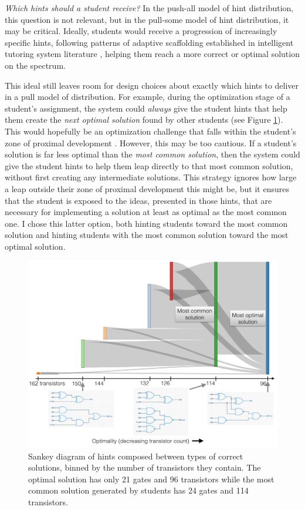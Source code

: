 {\it Which hints should a student receive?} In the push-all model of hint distribution, this question is not relevant, but in the pull-some model of hint distribution, it may be critical. Ideally, students would receive a progression of increasingly specific hints, following patterns of adaptive scaffolding established in intelligent tutoring system literature \cite{andes}, helping them reach a more correct or optimal solution on the spectrum. 

This ideal still leaves room for design choices about exactly which hints to deliver in a pull model of distribution. For example, during the optimization stage of a student's assignment, the system could \textit{always} give the student hints that help them create the \textit{next optimal solution} found by other students (see Figure \ref{fig:sankey}). This would hopefully be an optimization challenge that falls within the student's zone of proximal development \cite{ZMP}. However, this may be too cautious. If a student's solution is far less optimal than the \textit{most common solution}, then the system could give the student hints to help them leap directly to that most common solution, without first creating any intermediate solutions. This strategy ignores how large a leap outside their zone of proximal development this might be, but it ensures that the student is exposed to the ideas, presented in those hints, that are necessary for implementing a solution at least as optimal as the most common one. I chose this latter option, both hinting students toward the most common solution and hinting students with the most common solution toward the most optimal solution.

\begin{figure}
\centering
\includegraphics[width=1.0\columnwidth]{Body/figures/classoverflow/annotated_Sankey_onecolumn.png}
\caption{Sankey diagram of hints composed between types of correct solutions, binned by the number of transistors they contain. The optimal solution has only 21 gates and 96 transistors while the most common solution generated by students has 24 gates and 114 transistors.}
\label{fig:sankey}
\end{figure}

